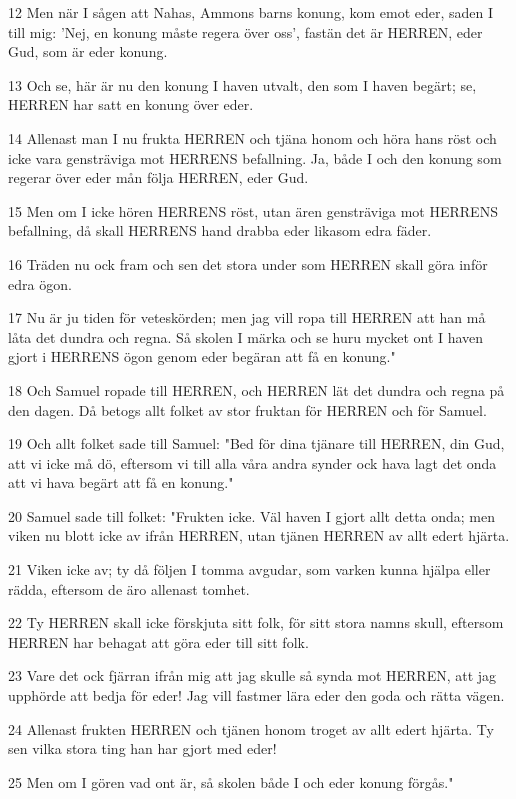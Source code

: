 \par 12 Men när I sågen att Nahas, Ammons barns konung, kom emot eder, saden I till mig: 'Nej, en konung måste regera över oss', fastän det är HERREN, eder Gud, som är eder konung.
\par 13 Och se, här är nu den konung I haven utvalt, den som I haven begärt; se, HERREN har satt en konung över eder.
\par 14 Allenast man I nu frukta HERREN och tjäna honom och höra hans röst och icke vara gensträviga mot HERRENS befallning. Ja, både I och den konung som regerar över eder mån följa HERREN, eder Gud.
\par 15 Men om I icke hören HERRENS röst, utan ären gensträviga mot HERRENS befallning, då skall HERRENS hand drabba eder likasom edra fäder.
\par 16 Träden nu ock fram och sen det stora under som HERREN skall göra inför edra ögon.
\par 17 Nu är ju tiden för veteskörden; men jag vill ropa till HERREN att han må låta det dundra och regna. Så skolen I märka och se huru mycket ont I haven gjort i HERRENS ögon genom eder begäran att få en konung."
\par 18 Och Samuel ropade till HERREN, och HERREN lät det dundra och regna på den dagen. Då betogs allt folket av stor fruktan för HERREN och för Samuel.
\par 19 Och allt folket sade till Samuel: "Bed för dina tjänare till HERREN, din Gud, att vi icke må dö, eftersom vi till alla våra andra synder ock hava lagt det onda att vi hava begärt att få en konung."
\par 20 Samuel sade till folket: "Frukten icke. Väl haven I gjort allt detta onda; men viken nu blott icke av ifrån HERREN, utan tjänen HERREN av allt edert hjärta.
\par 21 Viken icke av; ty då följen I tomma avgudar, som varken kunna hjälpa eller rädda, eftersom de äro allenast tomhet.
\par 22 Ty HERREN skall icke förskjuta sitt folk, för sitt stora namns skull, eftersom HERREN har behagat att göra eder till sitt folk.
\par 23 Vare det ock fjärran ifrån mig att jag skulle så synda mot HERREN, att jag upphörde att bedja för eder! Jag vill fastmer lära eder den goda och rätta vägen.
\par 24 Allenast frukten HERREN och tjänen honom troget av allt edert hjärta. Ty sen vilka stora ting han har gjort med eder!
\par 25 Men om I gören vad ont är, så skolen både I och eder konung förgås."

